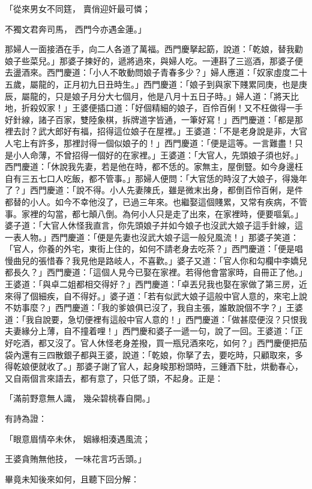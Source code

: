 「從來男女不同筳，  賣俏迎奸最可憐；

不獨文君奔司馬，  西門今亦遇金蓮。」

那婦人一面接酒在手，向二人各道了萬福。西門慶拏起筯，說道：「乾娘，替我勸娘子些菜兒。」那婆子揀好的，遞將過來，與婦人吃。一連斟了三巡酒，那婆子便去盪酒來。西門慶道：「小人不敢動問娘子青春多少？」婦人應道：「奴家虛度二十五歲，屬龍的，正月初九日丑時生。」西門慶道：「娘子到與家下賤累同庚，也是庚辰，屬龍的，只是娘子月分大七個月，他是八月十五日子時。」婦人道：「將天比地，折殺奴家！」王婆便插口道：「好個精細的娘子，百伶百俐！又不枉做得一手好針線，諸子百家，雙陸象棋，拆牌道字皆通，一筆好寫！」西門慶道：「都是那裡去討？武大郎好有福，招得這位娘子在屋裡。」王婆道：「不是老身說是非，大官人宅上有許多，那裡討得一個似娘子的！」西門慶道：「便是這等。一言難盡！只是小人命薄，不曾招得一個好的在家裡。」王婆道：「大官人，先頭娘子須也好。」西門慶道：「休說我先妻，若是他在時，都不恁的。家無主，屋倒豎。如今身邊枉自有三五七口人吃飯，都不管事。」那婦人便問：「大官恁的時沒了大娘子，得幾年了？」西門慶道：「說不得。小人先妻陳氏，雖是微末出身，都倒百伶百俐，是件都替的小人。如今不幸他沒了，已過三年來。也繼娶這個賤累，又常有疾病，不管事。家裡的勾當，都七顛八倒。為何小人只是走了出來，在家裡時，便要嘔氣。」婆子道：「大官人休怪我直言，你先頭娘子并如今娘子也沒武大娘子這手針線，這一表人物。」西門慶道：「便是先妻也沒武大娘子這一般兒風流！」那婆子笑道：「官人，你養的外宅，東街上住的，如何不請老身去吃茶？」西門慶道：「便是唱慢曲兒的張惜春？我見他是路岐人，不喜歡。」婆子又道：「官人你和勾欄中李嬌兒都長久？」西門慶道：「這個人見今已娶在家裡。若得他會當家時，自冊正了他。」王婆道：「與卓二姐都相交得好？」西門慶道：「卓丟兒我也娶在家做了第三房，近來得了個細疾，自不得好。」婆子道：「若有似武大娘子這般中官人意的，來宅上說不妨事麼？」西門慶道：「我的爹娘俱已沒了，我自主張，誰敢說個不字？」王婆道：「我自說要，急切便裡有這般中官人意的！」西門慶道：「做甚麼便沒？只恨我夫妻緣分上薄，自不撞着哩！」西門慶和婆子一遞一句，說了一回。王婆道：「正好吃酒，都又沒了。官人休怪老身差撥，買一瓶兒酒來吃，如何？」西門慶便把茄袋內還有三四散銀子都與王婆，說道：「乾娘，你拏了去，要吃時，只顧取來，多得乾娘便就收了。」那婆子謝了官人，起身睃那粉頭時，三鍾酒下肚，烘動春心，又自兩個言來語去，都有意了，只低了頭，不起身。正是：

「滿前野意無人識，  幾朵碧桃春自開。」

有詩為證：

「眼意眉情卒未休，  姻緣相湊遇風流；

王婆貪賄無他技，  一味花言巧舌頭。」

畢竟未知後來如何，且聽下回分解：

